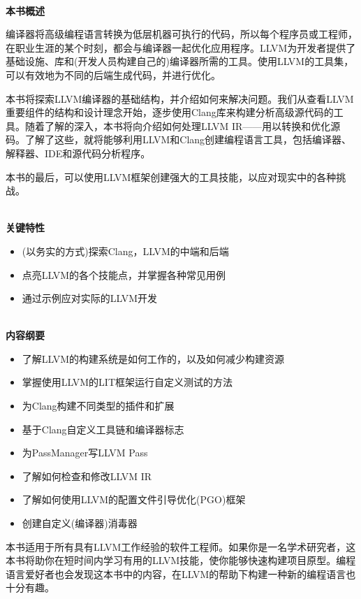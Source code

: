 \documentclass[11pt,a4paper,UTF8]{book}
\begin{document}
	\hspace*{\fill} \\ %
	\noindent\textbf{本书概述}
	
	编译器将高级编程语言转换为低层机器可执行的代码，所以每个程序员或工程师，在职业生涯的某个时刻，都会与编译器一起优化应用程序。LLVM为开发者提供了基础设施、库和(开发人员构建自己的)编译器所需的工具。使用LLVM的工具集，可以有效地为不同的后端生成代码，并进行优化。
	
	本书将探索LLVM编译器的基础结构，并介绍如何来解决问题。我们从查看LLVM重要组件的结构和设计理念开始，逐步使用Clang库来构建分析高级源代码的工具。随着了解的深入，本书将向介绍如何处理LLVM IR——用以转换和优化源码。了解了这些，就将能够利用LLVM和Clang创建编程语言工具，包括编译器、解释器、IDE和源代码分析程序。
	
	本书的最后，可以使用LLVM框架创建强大的工具技能，以应对现实中的各种挑战。
	
	\hspace*{\fill} \\ %
	\noindent\textbf{关键特性}
	\begin{itemize}
		\item (以务实的方式)探索Clang，LLVM的中端和后端
		\item 点亮LLVM的各个技能点，并掌握各种常见用例
		\item 通过示例应对实际的LLVM开发
	\end{itemize}

	\hspace*{\fill} \\ %
	\noindent\textbf{内容纲要}
	\begin{itemize}
		\item 了解LLVM的构建系统是如何工作的，以及如何减少构建资源
		\item 掌握使用LLVM的LIT框架运行自定义测试的方法
		\item 为Clang构建不同类型的插件和扩展
		\item 基于Clang自定义工具链和编译器标志
		\item 为PassManager写LLVM Pass
		\item 了解如何检查和修改LLVM IR
		\item 了解如何使用LLVM的配置文件引导优化(PGO)框架
		\item 创建自定义(编译器)消毒器
	\end{itemize}

	本书适用于所有具有LLVM工作经验的软件工程师。如果你是一名学术研究者，这本书将助你在短时间内学习有用的LLVM技能，使你能够快速构建项目原型。编程语言爱好者也会发现这本书中的内容，在LLVM的帮助下构建一种新的编程语言也十分有趣。
	
\end{document}

